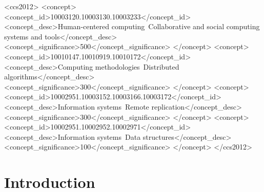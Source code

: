 \documentclass[sigplan]{acmart}
\begin{document}
\begin{CCSXML}
<ccs2012>
   <concept>
       <concept_id>10003120.10003130.10003233</concept_id>
       <concept_desc>Human-centered computing~Collaborative and social computing systems and tools</concept_desc>
       <concept_significance>500</concept_significance>
       </concept>
   <concept>
       <concept_id>10010147.10010919.10010172</concept_id>
       <concept_desc>Computing methodologies~Distributed algorithms</concept_desc>
       <concept_significance>300</concept_significance>
       </concept>
   <concept>
       <concept_id>10002951.10003152.10003166.10003172</concept_id>
       <concept_desc>Information systems~Remote replication</concept_desc>
       <concept_significance>300</concept_significance>
       </concept>
   <concept>
       <concept_id>10002951.10002952.10002971</concept_id>
       <concept_desc>Information systems~Data structures</concept_desc>
       <concept_significance>100</concept_significance>
       </concept>
 </ccs2012>
\end{CCSXML}





\maketitle
\pagestyle{plain}

\section{Introduction}\label{sec:introduction}
\end{document}
